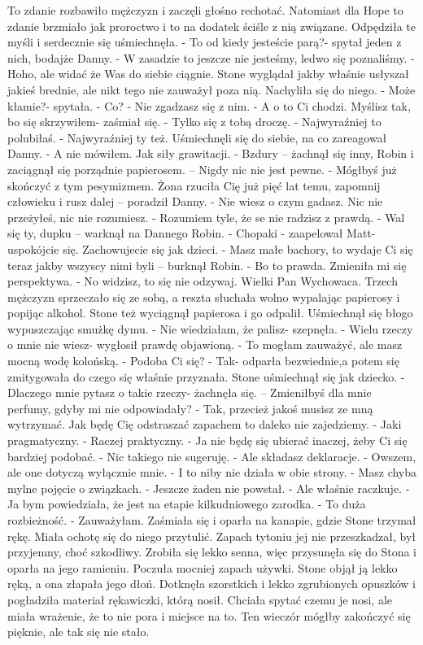 \documentclass[12pt,a4paper]{book}
\begin{document}
To zdanie rozbawiło mężczyzn i zaczęli głośno rechotać. Natomiast dla Hope to zdanie brzmiało jak proroctwo i to na dodatek ściśle z nią związane. Odpędziła te myśli i serdecznie się uśmiechnęła. 
- To od kiedy jesteście parą?- spytał jeden z nich, bodajże Danny. 
- W zasadzie to jeszcze nie jesteśmy, ledwo się poznaliśmy. 
- Hoho, ale widać że Was do siebie ciągnie. 
Stone wyglądał jakby właśnie usłyszał jakieś brednie, ale nikt tego nie zauważył poza nią. 
Nachyliła się do niego. 
- Może kłamie?- spytała. 
- Co?
- Nie zgadzasz się z nim. 
- A o to Ci chodzi. Myślisz tak, bo się skrzywiłem- zaśmiał się. 
- Tylko się z tobą droczę.
- Najwyraźniej to polubiłaś.
- Najwyraźniej ty też. 
Uśmiechnęli się do siebie, na co zareagował Danny.
- A nie mówiłem. Jak siły grawitacji. 
- Bzdury – żachnął się inny, Robin i zaciągnął się porządnie papierosem. – Nigdy nic nie jest pewne. 
- Mógłbyś już skończyć z tym pesymizmem. Żona rzuciła Cię już pięć lat temu, zapomnij człowieku i rusz dalej – poradził Danny. 
- Nie wiesz o czym gadasz. Nic nie przeżyłeś, nic nie rozumiesz. 
- Rozumiem tyle, że se nie radzisz z prawdą. 
- Wal się ty, dupku – warknął na Dannego Robin. 
- Chopaki - zaapelował Matt- uspokójcie się. Zachowujecie się jak dzieci. 
- Masz małe bachory, to wydaje Ci się teraz jakby wszyscy nimi byli – burknął Robin.
- Bo to prawda. Zmieniła mi się perspektywa. 
- No widzisz, to się nie odzywaj. Wielki Pan Wychowaca. 
Trzech mężczyzn sprzeczało się ze sobą, a reszta słuchała wolno wypalając papierosy i popijąc alkohol. 
Stone też wyciągnął papierosa i go odpalił. Uśmiechnął się błogo wypuszczając smużkę dymu. 
- Nie wiedziałam, że palisz- szepnęła. 
- Wielu rzeczy o mnie nie wiesz- wygłosił prawdę objawioną. 
- To mogłam zauważyć, ale masz mocną wodę kolońską. 
- Podoba Ci się?
- Tak- odparła bezwiednie,a potem się zmitygowała do czego się właśnie przyznała. 
Stone uśmiechnął się jak dziecko.
- Dlaczego mnie pytasz o takie rzeczy- żachnęła się. – Zmieniłbyś dla mnie perfumy, gdyby mi nie odpowiadały?
- Tak, przecież jakoś musisz ze mną wytrzymać. Jak będę Cię odstraszać zapachem to daleko nie zajedziemy.
- Jaki pragmatyczny.
- Raczej praktyczny.
- Ja nie będę się ubierać inaczej, żeby Ci się bardziej podobać. 
- Nic takiego nie sugeruję. 
- Ale składasz deklaracje.
- Owszem, ale one dotyczą wyłącznie mnie. 
- I to niby nie działa w obie strony. 
- Masz chyba mylne pojęcie o związkach.
- Jeszcze żaden nie powstał.
- Ale właśnie raczkuje.
- Ja bym powiedziała, że jest na etapie kilkudniowego zarodka. 
- To duża rozbieżność.
- Zauważyłam.
Zaśmiała się i oparła na kanapie, gdzie Stone trzymał rękę. Miała ochotę się do niego przytulić. Zapach tytoniu jej nie przeszkadzał, był przyjemny, choć szkodliwy. Zrobiła się lekko senna, więc przysunęła się do Stona i oparła na jego ramieniu. Poczuła mocniej zapach używki. Stone objął ją lekko ręką, a ona złapała jego dłoń. Dotknęła szorstkich i lekko zgrubionych opuszków i pogładziła materiał rękawiczki, którą nosił. Chciała spytać czemu je nosi, ale miała wrażenie, że to nie pora i miejsce na to. Ten wieczór mógłby zakończyć się pięknie, ale tak się nie stało. 
\end{document}
